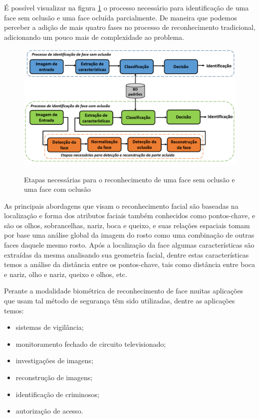 É possível visualizar na figura \ref{fig:processo_rec} o processo necessário para identificação de uma face sem oclusão e uma face ocluída parcialmente. De maneira que podemos perceber a adição de mais quatro fases no processo de reconhecimento tradicional, adicionando um pouco mais de complexidade ao problema.


\begin{figure}[H]
\centering
\caption{Etapas necessárias para o reconhecimento de uma face sem oclusão e uma face com oclusão}
\includegraphics[scale = 0.37]{imgs3/etapas_biometricas}
\label{fig:processo_rec}
\end{figure}



As principais abordagens que visam o reconhecimento facial são baseadas na localização e forma dos atributos faciais também conhecidos como pontos-chave, e são os olhos, sobrancelhas, nariz, boca e queixo, e suas relações espaciais tomam por base uma análise global da imagem do rosto como uma combinação de outras faces daquele mesmo rosto. Após a localização da face algumas características são extraídas da mesma analisando sua geometria facial, dentre estas características temos a análise da distância entre os pontos-chave, tais como distância entre boca e nariz, olho e nariz, queixo e olhos, etc. 



Perante a modalidade biométrica de reconhecimento de face muitas aplicações que usam tal método de segurança têm sido utilizadas, dentre as aplicações temos:

\begin{itemize}
\item sistemas de vigilância;
\item monitoramento fechado de circuito televisionado;
\item investigações de imagens;
\item reconstrução de imagens;
\item identificação de criminosos;
\item autorização de acesso.
\end{itemize}

